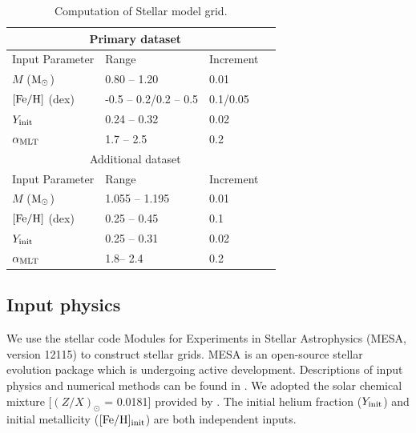 \begin{table}
	\centering
	\caption{Computation of Stellar model grid.}
	\label{tab:grid}
	\begin{tabular}{llll} %
		\hline
		\multicolumn{3}{c}{Primary dataset}\\
		\hline
		Input Parameter & Range & Increment \\
        \hline
	$M$ ($\rm M_{\odot}$) & 0.80 -- 1.20 &  0.01\\
        $\rm{[Fe/H]}$ (dex) & -0.5 -- 0.2/0.2 -- 0.5 & 0.1/0.05\\
        	$Y_{\rm init}$ & 0.24 -- 0.32 & 0.02\\
        $\alpha_{\rm{MLT}}$  & 1.7 -- 2.5&  0.2\\
        \hline
       \multicolumn{3}{c}{Additional dataset}\\
	\hline
	Input Parameter & Range & Increment \\
        \hline
	$M$ ($\rm M_{\odot}$)  & 1.055 -- 1.195 &  0.01\\
        $\rm{[Fe/H]}$ (dex) & 0.25 -- 0.45 & 0.1\\
        	$Y_{\rm init}$ & 0.25 -- 0.31 & 0.02\\
        $\alpha_{\rm{MLT}}$  & 1.8-- 2.4&  0.2\\
	\hline
	\end{tabular}
\end{table}

\subsection{Input physics}\label{subsec:stellar_model}

We use the stellar code Modules for Experiments in Stellar Astrophysics
(\textsc{MESA}, version 12115) to construct stellar grids. 
\textsc{MESA} is an open-source stellar evolution package which is undergoing active development. 
Descriptions of input physics and numerical methods
can be found in \citet{2011ApJS..192....3P,2013ApJS..208....4P, 2015ApJS..220...15P}.
We adopted the solar chemical mixture [$(Z/X)_{\odot}$ = 0.0181]
provided by \citet{2009ARA&A..47..481A}. 
The initial helium fraction ($Y_{\rm init}$) and initial metallicity ($\rm{[Fe/H]_{init}}$) are both independent inputs. 

